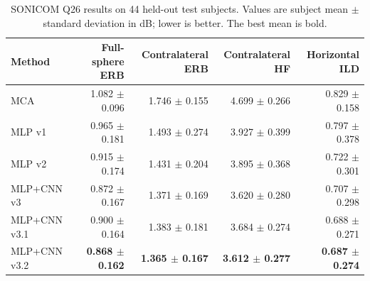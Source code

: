 \begin{table}[t]
\centering
\caption{SONICOM Q26 results on 44 held-out test subjects. Values are subject mean $\pm$ standard deviation in dB; lower is better. The best mean is bold.}
\label{tab:sonicom-final-test}
\begin{tabular}{lrrrr}
\toprule
Method & Full-sphere ERB & Contralateral ERB & Contralateral HF & Horizontal ILD \\
\midrule
MCA & 1.082 $\pm$ 0.096 & 1.746 $\pm$ 0.155 & 4.699 $\pm$ 0.266 & 0.829 $\pm$ 0.158 \\
MLP v1 & 0.965 $\pm$ 0.181 & 1.493 $\pm$ 0.274 & 3.927 $\pm$ 0.399 & 0.797 $\pm$ 0.378 \\
MLP v2 & 0.915 $\pm$ 0.174 & 1.431 $\pm$ 0.204 & 3.895 $\pm$ 0.368 & 0.722 $\pm$ 0.301 \\
MLP+CNN v3 & 0.872 $\pm$ 0.167 & 1.371 $\pm$ 0.169 & 3.620 $\pm$ 0.280 & 0.707 $\pm$ 0.298 \\
MLP+CNN v3.1 & 0.900 $\pm$ 0.164 & 1.383 $\pm$ 0.181 & 3.684 $\pm$ 0.274 & 0.688 $\pm$ 0.271 \\
MLP+CNN v3.2 & \textbf{0.868 $\pm$ 0.162} & \textbf{1.365 $\pm$ 0.167} & \textbf{3.612 $\pm$ 0.277} & \textbf{0.687 $\pm$ 0.274} \\
\bottomrule
\end{tabular}
\end{table}
